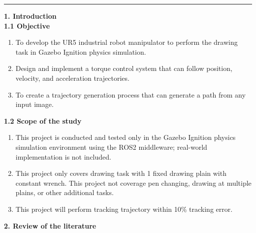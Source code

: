 \documentclass[10pt]{article}
\begin{document}
\vspace{0.4cm}
\noindent
\rule{\textwidth}{1pt}

\linespread{1.5} 
\vspace{0.2cm}
\noindent
\large
\textbf{1. Introduction} \\
\textbf{1.1 Objective}  \\
\normalsize
\begin{enumerate}[nosep, itemsep=-2pt] 
    \item To develop the UR5 industrial robot manipulator to perform the drawing task in Gazebo Ignition physics simulation. 
    \item Design and implement a torque control system that can follow position, velocity, and acceleration trajectories.
    \item To create a trajectory generation process that can generate a path from any input image.
\end{enumerate}
  
\noindent
\large 
\textbf{1.2 Scope of the study} \\ 
\normalsize
\begin{enumerate}[nosep, itemsep=-2pt] 
    \item This project is conducted and tested only in the Gazebo Ignition physics simulation environment using the ROS2 middleware; real-world implementation is not included.
    \item This project only covers drawing task with 1 fixed drawing plain with constant wrench. This project not coverage pen changing, drawing at multiple plains, or other additional tasks.
    \item This project will perform tracking trajectory within 10\% tracking error.
\end{enumerate}

\large
\noindent 
\textbf{2. Review of the literature} \\
\normalsize
\end{document}
